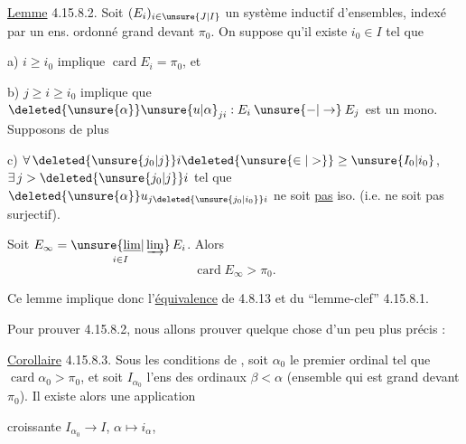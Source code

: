 
\uline{Lemme} 4.15.8.2. Soit $(E_i)_{i\in\unsure{J|I}}$ un système inductif d'ensembles, indexé par un ens. ordonné  grand devant $\pi_0$. On suppose qu'il existe $i_0\in I$ tel que

a) $i\geq i_0$ implique $\operatorname{card} E_i=\pi_0$, et

b) $j\geq i\geq i_0$ implique que $\deleted{\unsure{\alpha}}\unsure{u|\alpha}_{ji}:E_i\mathbin{\unsure{-|\to}} E_j$ est un mono. Supposons de plus

c) $\forall\,\deleted{\unsure{j_0|j}}i\deleted{\unsure{\in|>}}\geq \unsure{I_0|i_0}$, $\exists\, j>\deleted{\unsure{j_0|j}}i$ tel que $\deleted{\unsure{\alpha}}u_{j\deleted{\unsure{j_0|i_0}}i}$ ne soit \uline{pas} iso. (i.e. ne soit pas surjectif).

 Soit $E_\infty=\underset{i\in I}{\unsure{\underline{\lim}|\varinjlim}}\,E_i$. Alors
\[
\operatorname{card} E_\infty>\pi_0.
\]

Ce lemme implique donc l'\uline{équivalence} de 4.8.13 et du ``lemme-clef'' 4.15.8.1.

Pour prouver 4.15.8.2, nous allons prouver quelque chose d'un peu plus précis :

\uline{Corollaire} 4.15.8.3. Sous les conditions de , soit $\alpha_0$ le premier ordinal tel que $\operatorname{card}\alpha_0>\pi_0$, et soit $I_{\alpha_0}$ l'ens des ordinaux $\beta<\alpha$ (ensemble  qui est grand devant $\pi_0$). Il existe alors une application

 croissante $I_{\alpha_0}\longrightarrow I$, $\alpha\longmapsto i_\alpha$, 
